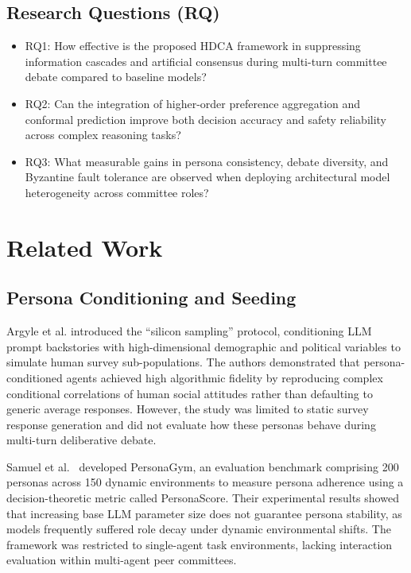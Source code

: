 \documentclass[a4paper,fleqn]{cas-sc}
\begin{document}
\subsection{Research Questions (RQ)}
\begin{itemize}
    \item RQ1: How effective is the proposed HDCA framework in suppressing information cascades and artificial consensus during multi-turn committee debate compared to baseline models?
    \item RQ2: Can the integration of higher-order preference aggregation and conformal prediction improve both decision accuracy and safety reliability across complex reasoning tasks?
    \item RQ3: What measurable gains in persona consistency, debate diversity, and Byzantine fault tolerance are observed when deploying architectural model heterogeneity across committee roles?
\end{itemize}

\section{Related Work}

\subsection{Persona Conditioning and Seeding}
Argyle et al. \cite{3} introduced the ``silicon sampling'' protocol, conditioning LLM prompt backstories with high-dimensional demographic and political variables to simulate human survey sub-populations. The authors demonstrated that persona-conditioned agents achieved high algorithmic fidelity by reproducing complex conditional correlations of human social attitudes rather than defaulting to generic average responses. However, the study was limited to static survey response generation and did not evaluate how these personas behave during multi-turn deliberative debate.

Samuel et al.~\cite{32} developed PersonaGym, an evaluation benchmark comprising 200 personas across 150 dynamic environments to measure persona adherence using a decision-theoretic metric called PersonaScore. Their experimental results showed that increasing base LLM parameter size does not guarantee persona stability, as models frequently suffered role decay under dynamic environmental shifts. The framework was restricted to single-agent task environments, lacking interaction evaluation within multi-agent peer committees.
\end{document}
